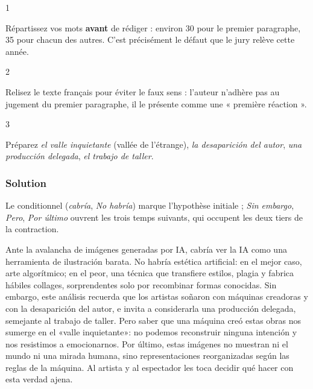 \documentclass[11pt,a4paper]{article}
\begin{document}
\begin{indication}{1}

Répartissez vos mots \textbf{avant} de rédiger : environ 30 pour le premier paragraphe, 35 pour chacun des autres. C'est précisément le défaut que le jury relève cette année.

\end{indication}

\begin{indication}{2}

Relisez le texte français pour éviter le faux sens : l'auteur n'adhère pas au jugement du premier paragraphe, il le présente comme une « première réaction ».

\end{indication}

\begin{indication}{3}

Préparez \emph{el valle inquietante} (vallée de l'étrange), \emph{la desaparición del autor}, \emph{una producción delegada}, \emph{el trabajo de taller}.

\end{indication}

\hypertarget{solution-6}{%
\subsubsection{Solution}\label{solution-6}}

Le conditionnel (\emph{cabría}, \emph{No habría}) marque l'hypothèse initiale ; \emph{Sin embargo}, \emph{Pero}, \emph{Por último} ouvrent les trois temps suivants, qui occupent les deux tiers de la contraction.

Ante la avalancha de imágenes generadas por IA, cabría ver la IA como una herramienta de ilustración barata. No habría estética artificial: en el mejor caso, arte algorítmico; en el peor, una técnica que transfiere estilos, plagia y fabrica hábiles collages, sorprendentes solo por recombinar formas conocidas. Sin embargo, este análisis recuerda que los artistas soñaron con máquinas creadoras y con la desaparición del autor, e invita a considerarla una producción delegada, semejante al trabajo de taller. Pero saber que una máquina creó estas obras nos sumerge en el «valle inquietante»: no podemos reconstruir ninguna intención y nos resistimos a emocionarnos. Por último, estas imágenes no muestran ni el mundo ni una mirada humana, sino representaciones reorganizadas según las reglas de la máquina. Al artista y al espectador les toca decidir qué hacer con esta verdad ajena.
\end{document}
